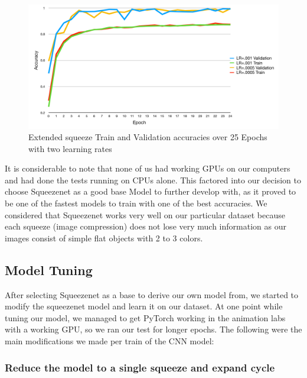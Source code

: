 \documentclass{article}
\begin{document}
\begin{figure}[b]
  \begin{center}
  \includegraphics[width=\textwidth]{./figs/extendedSqueeze-learningRatesCropped.png}
  \caption{Extended squeeze Train and Validation accuracies over 25 Epochs with two learning rates}
  \label{fig:extSqueezeAcc}
  \end{center}
\end{figure}

It is considerable to note that none of us had working GPUs on our computers and had done the tests 
running on CPUs alone. This factored into our decision to choose Squeezenet as a good base Model to 
further develop with, as it proved to be one of the fastest models to train with one of the best 
accuracies. We considered that Squeezenet works very well on our particular dataset because each squeeze 
(image compression) does not lose very much information as our images consist of simple flat objects 
with 2 to 3 colors.

\subsection{Model Tuning}

After selecting Squeezenet as a base to derive our own model from, we started to modify the squeezenet 
model and learn it on our dataset. At one point while tuning our model, we managed to get PyTorch working 
in the animation labs with a working GPU, so we ran our test for longer epochs. The following were the 
main modifications we made per train of the CNN model:

\subsubsection{Reduce the model to a single squeeze and expand cycle}
\end{document}
